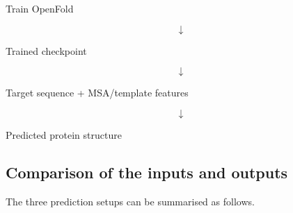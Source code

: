 \documentclass[11pt,a4paper]{article}
\begin{document}
\begin{center}
Train OpenFold
\end{center}

\[
\downarrow
\]

\begin{center}
Trained checkpoint
\end{center}

\[
\downarrow
\]

\begin{center}
Target sequence + MSA/template features
\end{center}

\[
\downarrow
\]

\begin{center}
Predicted protein structure
\end{center}


\subsection{Comparison of the inputs and outputs}

The three prediction setups can be summarised as follows.
\end{document}
